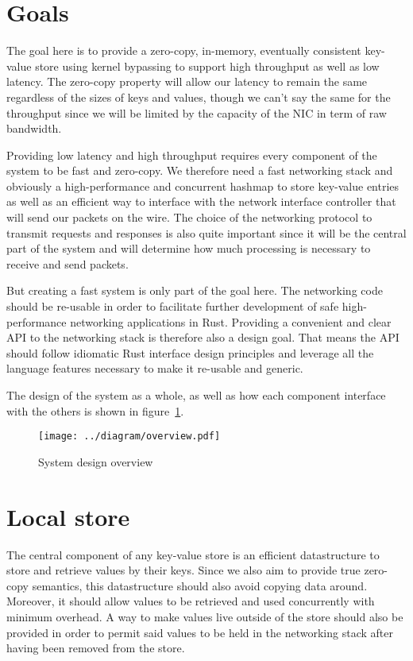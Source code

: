 \section{Goals}

The goal here is to provide a zero-copy, in-memory, eventually
consistent key-value store using kernel bypassing to support high
throughput as well as low latency. The zero-copy property will allow
our latency to remain the same regardless of the sizes of keys and
values, though we can't say the same for the throughput since we will
be limited by the capacity of the NIC in term of raw bandwidth.

Providing low latency and high throughput requires every component of
the system to be fast and zero-copy. We therefore need a fast
networking stack and obviously a high-performance and concurrent
hashmap to store key-value entries as well as an efficient way to
interface with the network interface controller that will send our
packets on the wire. The choice of the networking protocol to transmit
requests and responses is also quite important since it will be the
central part of the system and will determine how much processing is
necessary to receive and send packets.

But creating a fast system is only part of the goal here. The
networking code should be re-usable in order to facilitate further
development of safe high-performance networking
applications in Rust. Providing a convenient and clear API to the
networking stack is therefore also a design goal. That means the API
should follow idiomatic Rust interface design principles and leverage
all the language features necessary to make it re-usable and generic.

The design of the system as a whole, as well as how each component
interface with the others is shown in
figure~\ref{fig:design-overview}.

\begin{figure}[htb!]
  \texttt{[image: ../diagram/overview.pdf]}
  \caption{System design overview}
  \label{fig:design-overview}
\end{figure}

\section{Local store} \label{sec:local-store-design}

The central component of any key-value store is an efficient
datastructure to store and retrieve values by their keys. Since we
also aim to provide true zero-copy semantics, this datastructure
should also avoid copying data around. Moreover, it should allow
values to be retrieved and used concurrently with minimum overhead.
A way to make values live outside of the store should also be provided
in order to permit said values to be held in the networking stack
after having been removed from the store.

